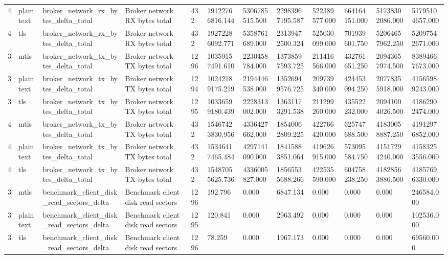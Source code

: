 \begin{longtable}{llllllllllll}
4 & plaintext & broker\_network\_rx\_bytes\_delta\_total & Broker network RX bytes total & 432 & 19122766816.144 & 5306785515.500 & 22983967195.587 & 522389577.000 & 664164151.000 & 51738302086.000 & 51795104657.000 \\
4 & tls & broker\_network\_rx\_bytes\_delta\_total & Broker network RX bytes total & 432 & 19272286092.771 & 5358761689.000 & 23139472500.324 & 525030099.000 & 701939601.750 & 52064657962.250 & 52097542671.000 \\
3 & mtls & broker\_network\_tx\_bytes\_delta\_total & Broker network TX bytes total & 1296 & 10359157491.610 & 2230458784.000 & 13738597593.725 & 211416566.000 & 432761651.250 & 20943657974.500 & 83894667673.000 \\
3 & plaintext & broker\_network\_tx\_bytes\_delta\_total & Broker network TX bytes total & 1294 & 10242189175.219 & 2194446538.000 & 13526949576.725 & 209739340.000 & 424453094.250 & 20778355918.000 & 41565989243.000 \\
3 & tls & broker\_network\_tx\_bytes\_delta\_total & Broker network TX bytes total & 1295 & 10336599180.439 & 2228313002.000 & 13631173291.538 & 211299260.000 & 435522232.000 & 20941004026.500 & 41862902474.000 \\
4 & mtls & broker\_network\_tx\_bytes\_delta\_total & Broker network TX bytes total & 432 & 15467423830.956 & 4336427662.000 & 18540062809.225 & 422766420.000 & 625747688.500 & 41830058887.250 & 41912976852.000 \\
4 & plaintext & broker\_network\_tx\_bytes\_delta\_total & Broker network TX bytes total & 432 & 15346417465.484 & 4297141090.000 & 18415883851.064 & 419626915.000 & 573095584.750 & 41517294240.000 & 41583253556.000 \\
4 & tls & broker\_network\_tx\_bytes\_delta\_total & Broker network TX bytes total & 432 & 15487055625.736 & 4336005827.000 & 18565535688.266 & 422535590.000 & 604758238.250 & 41828563886.500 & 41857696330.000 \\
3 & mtls & benchmark\_client\_disk\_read\_sectors\_delta & Benchmark client disk read sectors & 1296 & 192.796 & 0.000 & 6847.134 & 0.000 & 0.000 & 0.000 & 246584.000 \\
3 & plaintext & benchmark\_client\_disk\_read\_sectors\_delta & Benchmark client disk read sectors & 1295 & 120.841 & 0.000 & 2963.492 & 0.000 & 0.000 & 0.000 & 102536.000 \\
3 & tls & benchmark\_client\_disk\_read\_sectors\_delta & Benchmark client disk read sectors & 1296 & 78.259 & 0.000 & 1967.173 & 0.000 & 0.000 & 0.000 & 69560.000 \\

\end{longtable}
